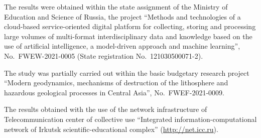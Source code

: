 \documentclass[
]{ceurart}
\begin{document}
\begin{acknowledgments}

  The results were obtained within the state assignment of the Ministry of Education and Science of Russia, the project ``Methods and technologies of a cloud-based service-oriented digital platform for collecting, storing and processing large volumes of multi-format interdisciplinary data and knowledge based on the use of artificial intelligence, a model-driven approach and machine learning'', No.~FWEW-2021-0005 (State registration No.~121030500071-2).

  The study was partially carried out within the basic budgetary research project ``Modern geodynamics, mechanisms of destruction of the lithosphere and hazardous geological processes in Central Asia'', No.~FWEF-2021-0009.

  The results obtained with the use of the network infrastructure of Telecommunication center of collective use ``Integrated information-computational network of Irkutsk scientific-educational complex'' (\url{http://net.icc.ru}).
\end{acknowledgments}

% 
\end{document}
